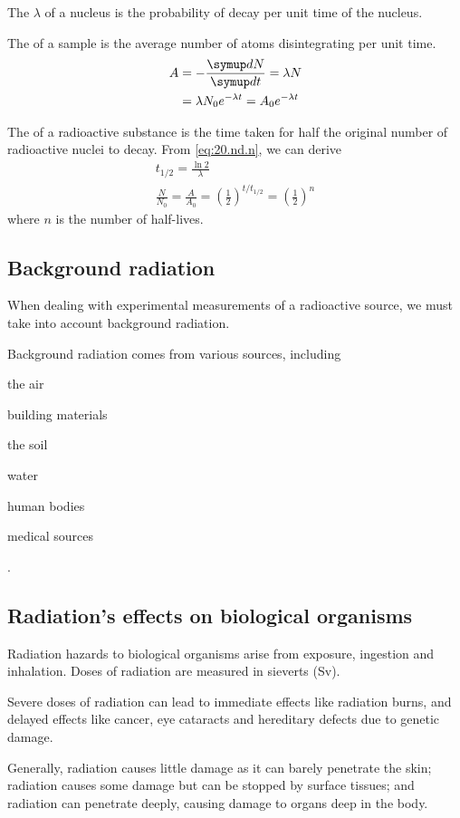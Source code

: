 \documentclass[Physics.tex]{subfiles}
\begin{document}
The  \(\lambda\) of a nucleus is the probability of decay per unit time of the nucleus.

The  of a sample is the average number of atoms disintegrating per unit time. \begin{equation}\begin{split}A &= -\sldd{N}{t} = \lambda N\\&= \lambda N_0e^{-\lambda t} = A_0e^{-\lambda t}\end{split}\end{equation}

The  of a radioactive substance is the time taken for half the original number of radioactive nuclei to decay. From \eqref{eq:20.nd.n}, we can derive \begin{gather}t_{1/2} = \frac{\ln2}{\lambda}\\\frac{N}{N_0} = \frac{A}{A_0} = \left(\frac{1}{2}\right)^{t/t_{1/2}} = \left(\frac{1}{2}\right)^n\end{gather} where \(n\) is the number of half-lives.
\subsection{Background radiation}
When dealing with experimental measurements of a radioactive source, we must take into account background radiation.

Background radiation comes from various sources, including \begin{slinenum}
\item the air
\item building materials
\item the soil
\item water
\item human bodies
\item medical sources
\end{slinenum}.
\subsection{Radiation's effects on biological organisms}
Radiation hazards to biological organisms arise from exposure, ingestion and inhalation. Doses of radiation are measured in sieverts (\si{\sievert}).

Severe doses of radiation can lead to immediate effects like radiation burns, and delayed effects like cancer, eye cataracts and hereditary defects due to genetic damage.

Generally, \upalpha{} radiation causes little damage as it can barely penetrate the skin; \upbeta{} radiation causes some damage but can be stopped by surface tissues; and \upgamma{} radiation can penetrate deeply, causing damage to organs deep in the body.
\end{document}
